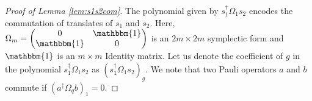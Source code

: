 \documentclass[prx,twocolumn,superscriptaddress,nofootinbib,showpacs,notitlepage]{revtex4-2}
\newcommand{\beq}{\begin{eqnarray}}
\newcommand{\eeq}{\end{eqnarray}}
\begin{document}
\begin{proof}[Proof of Lemma \ref{lem:s1s2com}]

The polynomial given by
$s_1^\dagger \Omega_1 s_2$ encodes the commutation of translates of $s_1$ and $s_2$. Here,  $\Omega_m=\begin{pmatrix}
0 & \mathbbm{1} \\
\mathbbm{1} & 0 
\end{pmatrix}$ is an $2m\times 2m$ symplectic form and $\mathbbm{1}$ is an $m\times m$ Identity matrix.
Let us denote the coefficient of $g$ in the polynomial $s_1^\dagger \Omega_1 s_2$ as $(s_1^\dagger \Omega_1 s_2)_g$. We note that two Pauli operators $a$ and $b$ commute if $(a^\dagger \Omega_q b)_1=0$. 


\end{proof}
\end{document}
